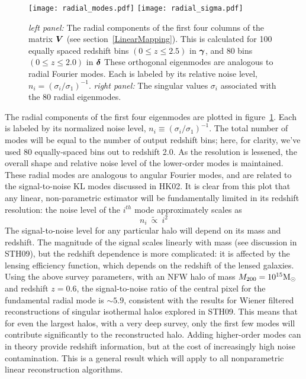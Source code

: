 \begin{figure*}[t]
 \centering
 \texttt{[image: radial\_modes.pdf]}
 \texttt{[image: radial\_sigma.pdf]}  
 \caption[The radial components and singular values of the filtering]
 {\textit{left panel:} 
   The radial components of the first four
   columns of the matrix $\boldsymbol{V}$ (see section~\ref{LinearMapping}).
   This is calculated for 100 equally spaced redshift bins $(0\le z\le 2.5)$ 
   in $\boldsymbol{\gamma}$, and 80 bins $(0\le z\le 2.0)$ in $\boldsymbol{\delta}$
   These orthogonal eigenmodes are analogous to radial Fourier modes.  Each
   is labeled by its relative noise level, $n_i = (\sigma_i/\sigma_1)^{-1}$.
   \textit{right panel:}
   The singular values $\sigma_i$ associated with the 80 radial eigenmodes.
 \label{fig_radial_modes} }
\end{figure*} 

The radial components of the first four eigenmodes are plotted in 
figure~\ref{fig_radial_modes}.  Each is labeled by its normalized 
noise level, $n_i \equiv (\sigma_i/\sigma_1)^{-1}$.
The total number of modes will be equal to the number of output redshift 
bins; here, for clarity, we've used 80 equally-spaced bins out to redshift 2.0.
As the resolution is lessened, the overall shape and relative noise level of 
the lower-order modes is maintained.
These radial modes are analogous to angular Fourier modes,
and are related to the signal-to-noise KL modes discussed in HK02.
It is clear from this plot that any linear, non-parametric
estimator will be fundamentally limited in its redshift resolution: 
the noise level of the $i^{th}$ mode approximately scales as
\begin{equation}
  n_i\ \widetilde{\propto}\ i^2
\end{equation}
The signal-to-noise level for any particular halo will depend on
its mass and redshift. The magnitude of the signal
scales linearly with mass (see discussion in STH09), 
but the redshift dependence is more complicated: it is
affected by the lensing efficiency function, which depends on the redshift
of the lensed galaxies.  Using the above survey parameters, with an NFW halo 
of mass $M_{200} = 10^{15} \rm{M_\odot}$ and redshift $z=0.6$, 
the signal-to-noise ratio 
of the central pixel for the fundamental radial mode is $\sim 5.9$,
consistent with the results for Wiener filtered reconstructions of
singular isothermal halos explored in STH09.
This means that for even the largest halos, with a very deep survey,
only the first few modes will contribute significantly 
to the reconstructed halo.  Adding higher-order modes can in theory 
provide redshift information, but at the cost of increasingly high 
noise contamination. This is a general result which will apply to all 
nonparametric linear reconstruction algorithms.

